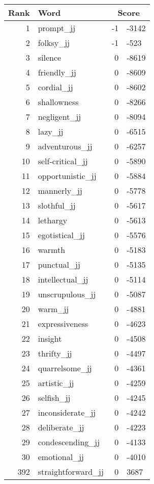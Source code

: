 \begin{longtable}[!htbp]{| rlr@{.}l |}
    \hline
    \textbf{Rank} & \textbf{Word} & \multicolumn{2}{c|}{\textbf{Score}} \\
    \hline
    \endhead
    1 & prompt\_jj & -1 & -3142 \\
    2 & folksy\_jj & -1 & -523 \\
    3 & silence & 0 & -8619 \\
    4 & friendly\_jj & 0 & -8609 \\
    5 & cordial\_jj & 0 & -8602 \\
    6 & shallowness & 0 & -8266 \\
    7 & negligent\_jj & 0 & -8094 \\
    8 & lazy\_jj & 0 & -6515 \\
    9 & adventurous\_jj & 0 & -6257 \\
    10 & self-critical\_jj & 0 & -5890 \\
    11 & opportunistic\_jj & 0 & -5884 \\
    12 & mannerly\_jj & 0 & -5778 \\
    13 & slothful\_jj & 0 & -5617 \\
    14 & lethargy & 0 & -5613 \\
    15 & egotistical\_jj & 0 & -5576 \\
    16 & warmth & 0 & -5183 \\
    17 & punctual\_jj & 0 & -5135 \\
    18 & intellectual\_jj & 0 & -5114 \\
    19 & unscrupulous\_jj & 0 & -5087 \\
    20 & warm\_jj & 0 & -4881 \\
    21 & expressiveness & 0 & -4623 \\
    22 & insight & 0 & -4508 \\
    23 & thrifty\_jj & 0 & -4497 \\
    24 & quarrelsome\_jj & 0 & -4361 \\
    25 & artistic\_jj & 0 & -4259 \\
    26 & selfish\_jj & 0 & -4245 \\
    27 & inconsiderate\_jj & 0 & -4242 \\
    28 & deliberate\_jj & 0 & -4223 \\
    29 & condescending\_jj & 0 & -4133 \\
    30 & emotional\_jj & 0 & -4010 \\
    392 & straightforward\_jj & 0 & 3687 \\

\end{longtable}
